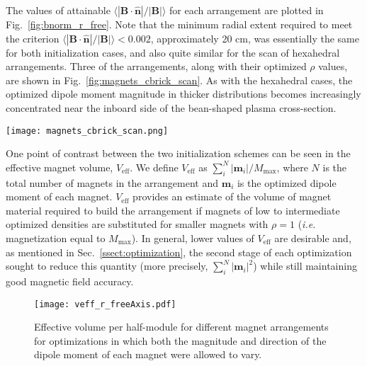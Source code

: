 \documentclass[11pt,onecolumn]{article}
\newcommand{\relbnorm}{\langle|\mathbf{B}\cdot\hat{\mathbf{n}}|
                       /|\mathbf{B}|\rangle}
\begin{document}
The values of attainable $\relbnorm$ for each arrangement are plotted
in Fig.~\ref{fig:bnorm_r_free}. Note that the minimum radial extent required
to meet the criterion $\relbnorm<0.002$, approximately 20 cm, was essentially 
the same for both initialization cases, and also quite similar for the scan of 
hexahedral arrangements. Three of the arrangements, along with their optimized
$\rho$ values, are shown in Fig.~\ref{fig:magnets_cbrick_scan}. As with the
hexahedral cases, the optimized dipole moment magnitude in thicker distributions
becomes increasingly concentrated near the inboard side of the bean-shaped
plasma cross-section.

\begin{figure*}
    \begin{center}
    \texttt{[image: magnets\_cbrick\_scan.png]}
    \caption{Renderings of arrangements curved bricks with radial 
             extents of (a) 10 cm, (b) 20 cm, and (c) 35 cm.
             The color scale corresponds to the value of $\rho$ obtained
             from an optimization in which the dipole moment's direction
             was initialized to point normally with respect to the 
             inner limiting surface.}
    \label{fig:magnets_cbrick_scan}
    \end{center}
\end{figure*}

One point of contrast between the two initialization schemes can be seen in 
the effective magnet volume, $V_\text{eff}$.
We define $V_\text{eff}$ as $\sum_i^{N}|\mathbf{m}_i|/M_\text{max}$,
where $N$ is the total number of magnets in the arrangement and 
$\mathbf{m}_i$ is the optimized dipole moment of each magnet. $V_\text{eff}$
provides an estimate of the volume of magnet material required to build
the arrangement if magnets of low to intermediate optimized 
densities are substituted for smaller magnets with $\rho=1$ (\textit{i.e.}
magnetization equal to $M_\text{max}$). 
In general, lower values of $V_\text{eff}$ are desirable and, as mentioned in 
Sec.~\ref{ssect:optimization}, the second stage of each optimization sought
to reduce this quantity (more precisely, $\sum_i^{N}|\mathbf{m}_i|^2$) while
still maintaining good magnetic field accuracy. 

\begin{figure}
    \begin{center}
    \texttt{[image: veff\_r\_freeAxis.pdf]}
    \caption{Effective volume per half-module for different magnet arrangements 
             for optimizations in which both the magnitude and direction of the
             dipole moment of each magnet were allowed to vary. }
    \label{fig:Veff}
    \end{center}
\end{figure}
\end{document}
